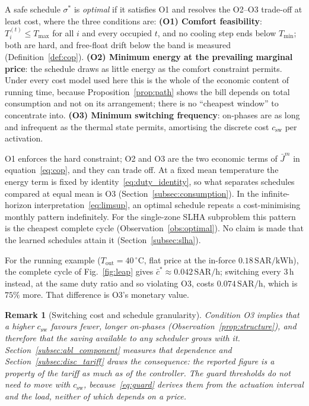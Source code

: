 \documentclass[pdflatex,sn-mathphys-num,iicol]{sn-jnl}
\theoremstyle{thmstyleone}\newtheorem{proposition}{Proposition}\newtheorem{corollary}{Corollary}
\theoremstyle{thmstyletwo}\newtheorem{remark}{Remark}\newtheorem{observation}{Observation}
\theoremstyle{thmstylethree}\newtheorem{definition}{Definition}
\newcommand{\sched}{\sigma}
\newcommand{\Tmin}{T_{\min}}
\newcommand{\Tmax}{T_{\max}}
\newcommand{\Tout}{T_{\mathrm{out}}}
\newcommand{\csw}{c_{\mathrm{sw}}}
\newcommand{\Jbar}{\bar{J}}
\newcommand{\SAR}{\text{SAR}}
\newcommand{\kWh}{\text{kWh}}
\begin{document}
A safe schedule $\sched^*$ is \emph{optimal} if it satisfies O1 and resolves the O2--O3 trade-off at least cost, where the three conditions are: \textbf{(O1) Comfort feasibility}: $T_i^{(t)}\le\Tmax$ for all $i$ and every occupied $t$, and no cooling step ends below $\Tmin$; both are hard, and free-float drift below the band is measured (Definition~\ref{def:cop}). \textbf{(O2) Minimum energy at the prevailing marginal price}: the schedule draws as little energy as the comfort constraint permits. Under every cost model used here this is the whole of the economic content of running time, because Proposition~\ref{prop:path} shows the bill depends on total consumption and not on its arrangement; there is no ``cheapest window'' to concentrate into. \textbf{(O3) Minimum switching frequency}: on-phases are as long and infrequent as the thermal state permits, amortising the discrete cost $\csw$ per activation.
 
O1 enforces the hard constraint; O2 and O3 are the two economic terms of $\Jbar^m$ in equation~\eqref{eq:cop}, and they can trade off. At a fixed mean temperature the energy term is fixed by identity~\eqref{eq:duty_identity}, so what separates schedules compared at equal mean is O3 (Section~\ref{subsec:consumption}). In the infinite-horizon interpretation~\eqref{eq:limsup}, an optimal schedule repeats a cost-minimising monthly pattern indefinitely. For the single-zone SLHA subproblem this pattern is the cheapest complete cycle (Observation~\ref{obs:optimal}). No claim is made that the learned schedules attain it (Section~\ref{subsec:slha}).
 
For the running example ($\Tout=40\,^\circ$C, flat price at the in-force $0.18\,\SAR/\kWh$), the complete cycle of Fig.~\ref{fig:leap} gives $\bar{c}^*\approx0.042\,\SAR/\text{h}$; switching every $3\,$h instead, at the same duty ratio and so violating O3, costs $0.074\,\SAR/\text{h}$, which is $75\%$ more. That difference is O3's monetary value.
 
\begin{remark}[Switching cost and schedule granularity]
\label{rem:csw}
Condition O3 implies that a higher $\csw$ favours fewer, longer on-phases (Observation~\ref{prop:structure}), and therefore that the saving available to any scheduler grows with it. Section~\ref{subsec:abl_component} measures that dependence and Section~\ref{subsec:disc_tariff} draws the consequence: the reported figure is a property of the tariff as much as of the controller. The guard thresholds do not need to move with $\csw$, because~\eqref{eq:guard} derives them from the actuation interval and the load, neither of which depends on a price.
\end{remark}
 
\end{document}
